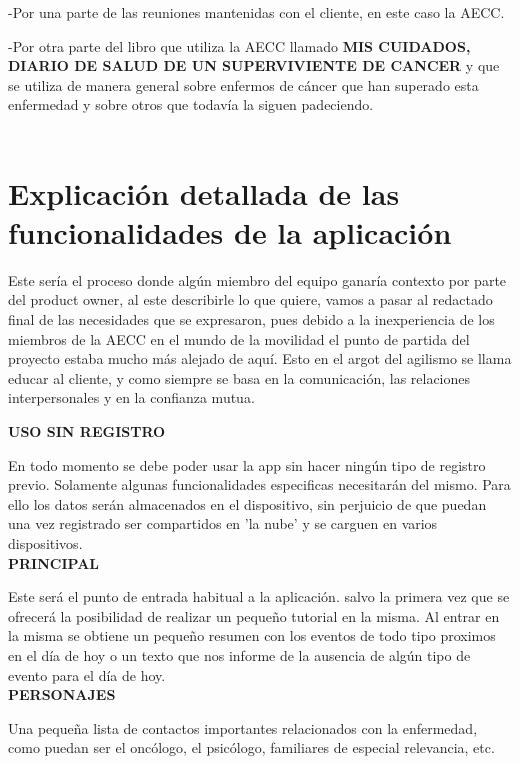 \documentclass[../pfc.tex]{subfiles}
\begin{document}
 

-Por una parte de las reuniones mantenidas con el cliente, en este caso la AECC.

-Por otra parte del libro que utiliza la AECC llamado \textbf{MIS CUIDADOS, DIARIO DE SALUD DE UN SUPERVIVIENTE DE CANCER} y que se utiliza de manera general sobre enfermos de cáncer que han superado esta enfermedad y sobre otros que todavía la siguen padeciendo.\\\\
	

	\section{Explicación detallada de las funcionalidades de la aplicación}

Este sería el proceso donde algún miembro del equipo ganaría contexto por parte del product owner, al este describirle lo que quiere, vamos a pasar al redactado final de las necesidades que se expresaron, pues debido a la inexperiencia de los miembros de la AECC en el mundo de la movilidad el punto de partida del proyecto estaba mucho más alejado de aquí. Esto en el argot del agilismo se llama educar al cliente, y como siempre se basa en la comunicación, las relaciones interpersonales y en la confianza mutua.

\textbf{USO SIN REGISTRO}

En todo momento se debe poder usar la app sin hacer ningún tipo de registro previo. Solamente algunas funcionalidades especificas necesitarán del mismo. Para ello los datos serán almacenados en el dispositivo, sin perjuicio de que puedan una vez registrado ser compartidos en 'la nube' y se carguen en varios dispositivos.\\

	\textbf{PRINCIPAL}
	
	Este será el punto de entrada habitual a la aplicación. salvo la primera vez que se ofrecerá la posibilidad de realizar un pequeño tutorial en la misma. Al entrar en la misma se obtiene un pequeño resumen con los eventos de todo tipo proximos en el día de hoy o un texto que nos informe de la ausencia de algún tipo de evento para el día de hoy.\\
	
	\textbf{PERSONAJES}
	
	Una pequeña lista de contactos importantes relacionados con la enfermedad, como puedan ser el oncólogo, el psicólogo, familiares de especial relevancia, etc.
	
\end{document}
